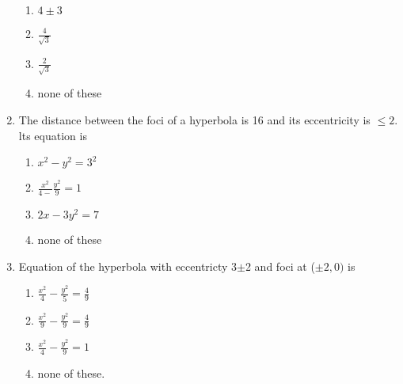 \documentclass[12pt]{article}
\begin{document}
\begin{enumerate}[resume]
\begin{enumerate}
\item $4\pm3$
\item $\frac{4}{\sqrt{3}}$
\item $\frac{2}{\sqrt{3}}$
\item none of these
\end{enumerate}
\item The distance between the foci of a hyperbola is 16 and its eccentricity is $\le{2}$. lts equation is
\begin{enumerate}
\item $x^2-y^2=3^2$
\item $\frac{x^2}{4-}\frac{y^2}{9}=1$
\item $2x-3y^2=7$
 \item none of these
 \end{enumerate}
 \item Equation of the hyperbola with eccentricty 3$\pm$2 and foci at ($\pm2,0)$ is
\begin{enumerate} 
	\item $\frac{x^2}{4}-\frac{y^2}{5}=\frac{4}{9}$

	\item  $\frac{x^2}{9}-\frac{y^2}{9}=\frac{4}{9}$
	\item  $\frac{x^2}{4}-\frac{y^2}{9}=1$
\item  none of these.
\end{enumerate}
\end{enumerate}
\end{document}
